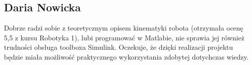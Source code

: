 \subsection{Daria Nowicka}
Dobrze radzi sobie z teoretycznym opisem kinematyki robota (otrzymała ocenę 5,5 z kursu Robotyka 1), lubi programować w Matlabie, nie sprawia jej również trudności obsługa toolboxa Simulink. Oczekuje, że dzięki realizacji projektu będzie miała możliwość praktycznego wykorzystania zdobytej dotychczas wiedzy.